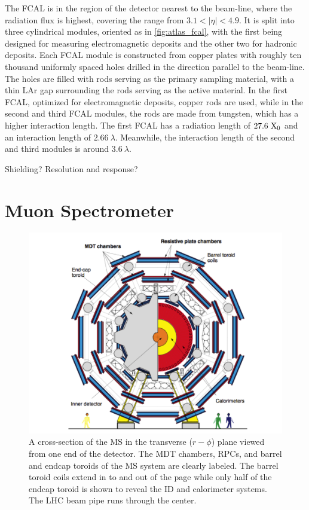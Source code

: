 The FCAL is in the region of the detector nearest to the beam-line, 
where the radiation flux is highest, covering the range
from $3.1 < |\eta| < 4.9$. It is split into three cylindrical modules,
oriented as in \fig\ref{fig:atlas_fcal}, with the first 
being designed for measuring electromagnetic deposits and the other
two for hadronic deposits.
Each FCAL module is constructed from copper plates with roughly ten thousand
uniformly spaced holes drilled in the direction parallel to the beam-line.
The holes are filled with rods serving as the primary sampling material, 
with a thin LAr gap surrounding the rods serving as the active material.
In the first FCAL, optimized for electromagnetic deposits,  
copper rods are used, while in the second and third FCAL modules, 
the rods are made from tungsten, which has a higher interaction length.
The first FCAL has a radiation length of $27.6~\textrm{X}_0$ and an 
interaction length of $2.66~\lambda$. Meanwhile, the interaction
length of the second and third modules is around $3.6~\lambda$.



Shielding? Resolution and response?




\section{Muon Spectrometer}

\begin{figure}[ht]
\centering
\includegraphics[width=.8\textwidth]{figures/atlas/ms_rphi}
\caption{A cross-section of the MS in the 
transverse ($r-\phi$) plane viewed from one end of the detector. 
The MDT chambers, RPCs, and
barrel and endcap toroids of the MS system are clearly labeled.
The barrel toroid coils extend in to and out of the page while only
half of the endcap toroid is shown to reveal the ID and calorimeter
systems.  The LHC beam pipe runs through the center.}
\label{fig:atlas_ms_rphi}
\end{figure}

